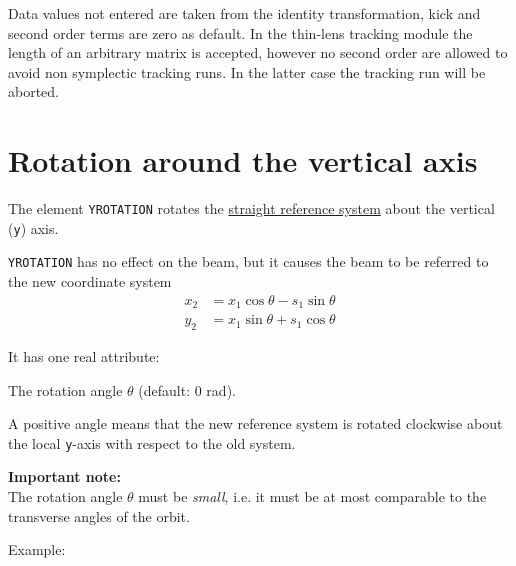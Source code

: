 Data values not entered are taken from the identity transformation, kick
and second order terms are zero as default. In the thin-lens tracking
module the length of an arbitrary matrix is accepted, however no second
order are allowed to avoid non symplectic tracking runs. In the latter
case the tracking run will be aborted.


\section{Rotation around the vertical axis}
\label{sec:yrotation}

The element {\tt YROTATION} rotates the
\hyperref[subsec:local_straight]{straight reference system} about the
vertical ({\tt y}) axis.


{\tt YROTATION} has no effect on the beam, but it
causes the beam to be referred to the new coordinate system  \\
\begin{equation}\begin{split}
x_2 &= x_1 \cos\theta - s_1 \sin\theta \\
y_2 &= x_1 \sin\theta + s_1 \cos\theta
\end{split}\end{equation}


It has one real attribute: 
\begin{madlist}
    The rotation angle $\theta$ (default: 0 rad).  
\end{madlist}

A positive angle means that the new reference system is rotated
clockwise about the local {\tt y}-axis with respect to the old system. 

{\bf Important note:} \\
The rotation angle $\theta$ must be \emph{small}, i.e. it must be at
most comparable to the transverse angles of the orbit. 

Example: 

